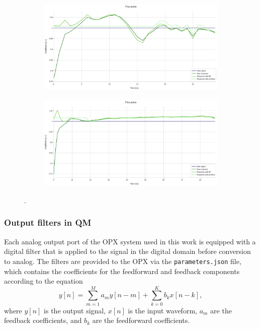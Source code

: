 \begin{figure}[h!]
    \centering
    \begin{subfigure}[t]{0.65\textwidth}
        \includegraphics[width=\textwidth]{figures/png/Cryoscope/filters/all_filters_no_pad.png}
        \caption{}
        \label{fig:IIR:nopad}
    \end{subfigure}
    \vspace{0.5cm}
    \begin{subfigure}[t]{0.65\textwidth}
        \includegraphics[width=\textwidth]{figures/png/Cryoscope/filters_long/IIR_FIR.png}
        \caption{}
        \label{fig:IIR:long}        
    \end{subfigure}
    \caption{.}
    \label{fig:IIR}
\end{figure}

\subsubsection{Output filters in QM}

Each analog output port of the OPX system used in this work is equipped with a digital filter that is applied to the signal in the digital domain before conversion to analog. 
The filters are provided to the OPX via the \texttt{parameters.json} file, which contains the coefficients for the feedforward and feedback components according to the equation
\begin{equation}\label{eq:OPX_filter}
    y[n] = \sum_{m=1}^{M} a_m y[n - m] + \sum_{k=0}^{K} b_k x[n - k],
\end{equation}
where $y[n]$ is the output signal, $x[n]$ is the input waveform, $a_m$ are the feedback coefficients, and $b_k$ are the feedforward coefficients.

